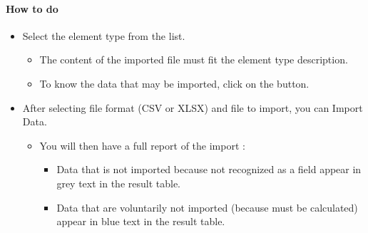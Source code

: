 \documentclass[letterpaper,10pt,english]{sphinxmanual}
\begin{document}
\paragraph{How to do}
\begin{itemize}
\item {} 
Select the element type from the list.
\begin{itemize}
\item {} 
The content of the imported file must fit the element type description.

\item {} 
To know the data that may be imported, click on the  button.

\end{itemize}

\item {} 
After selecting file format (CSV or XLSX) and file to import, you can Import Data.
\begin{itemize}
\item {} 
You will then have a full report of the import :
\begin{itemize}
\item {} 
Data that is not imported because not recognized as a field appear in grey text in the result table.

\item {} 
Data that are voluntarily not imported (because must be calculated) appear in blue text in the result table.

\end{itemize}

\end{itemize}

\end{itemize}
\end{document}
